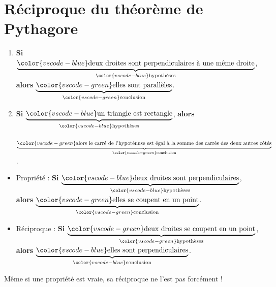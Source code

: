 \documentclass[../main.tex]{subfiles}
\begin{document}
    \part{Réciproque du théorème de Pythagore}

            \begin{exemple}
                \begin{enumerate}[1), font=\bfseries]
                    \item \textbf{Si} $\underbrace{\color{vscode-blue}%
                    \text{deux droites sont perpendiculaires à une même
                    droite}}_{\color{vscode-blue}\text{hypothèses}}$,
                    \textbf{alors} $\underbrace{\color{vscode-green}%
                    \text{elles sont parallèles}}_{\color{vscode-green}%
                    \text{conclusion}}$.
                    \item \textbf{Si} $\underbrace{\color{vscode-blue}%
                    \text{un triangle est rectangle}}_{\color{vscode-blue}\text{hypothèses}}$,
                    \textbf{alors} \par$\underbrace{\color{vscode-green}
                    \text{alors le carré de l'hypoténuse est égal à la somme des carrés des deux autres côtés}}_{\color{vscode-green}%
                    \text{conclusion}}$.
                \end{enumerate}
            \end{exemple}
            \begin{exemple}%
                \begin{itemize}
                    \item[]{Propriété :}
                        \textbf{Si} $\underbrace{\color{vscode-blue}%
                        \text{deux droites sont perpendiculaires}}_{\color{vscode-blue}\text{hypothèses}}$,
                        \textbf{alors} $\underbrace{\color{vscode-green}%
                        \text{elles se coupent en un point}}_{\color{vscode-green}%
                        \text{conclusion}}$.
                    \item[]{Réciproque :}
                        \textbf{Si} $\underbrace{\color{vscode-green}%
                        \text{deux droites se coupent en un point}}_{\color{vscode-green}\text{hypothèses}}$,
                        \textbf{alors} $\underbrace{\color{vscode-blue}%
                        \text{elles sont perpendiculaires}}_{\color{vscode-blue}%
                        \text{conclusion}}$.
                \end{itemize}
            \end{exemple}
            \begin{remarque}
                Même si une propriété est vraie, sa réciproque ne l'est pas forcément !
            \end{remarque}
\end{document}
